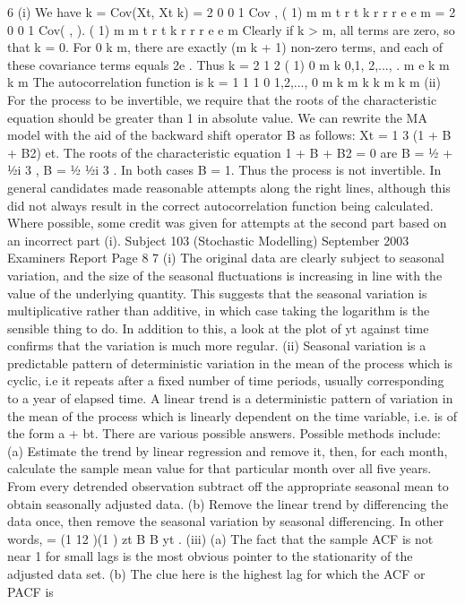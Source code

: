 6 (i) We have
k = Cov(Xt, Xt k) = 2
0 0
1
Cov ,
( 1)
m m
t r t k r
r r
e e
m
= 2
0 0
1
Cov( , ).
( 1)
m m
t r t k r
r r
e e
m
Clearly if k > m, all terms are zero, so that k = 0.
For 0 k m, there are exactly (m k + 1) non-zero terms, and each of these
covariance terms equals 2e . Thus
k =
2
1 2
( 1)
0
m k 0,1, 2,..., .
m e
k m
k m
The autocorrelation function is
k = 1
1
1 0
1,2,...,
0
m k
m
k
k m
k m
(ii) For the process to be invertible, we require that the roots of the characteristic
equation should be greater than 1 in absolute value.
We can rewrite the MA model with the aid of the backward shift operator B as
follows:
Xt =
1
3
(1 + B + B2) et.
The roots of the characteristic equation
1 + B + B2 = 0
are B = ½ + ½i 3 , B = ½ ½i 3 .
In both cases B = 1. Thus the process is not invertible.
In general candidates made reasonable attempts along the right lines, although this did not always
result in the correct autocorrelation function being calculated. Where possible, some credit was
given for attempts at the second part based on an incorrect part (i).
Subject 103 (Stochastic Modelling) September 2003 Examiners Report
Page 8
7 (i) The original data are clearly subject to seasonal variation, and the size of the
seasonal fluctuations is increasing in line with the value of the underlying
quantity. This suggests that the seasonal variation is multiplicative rather than
additive, in which case taking the logarithm is the sensible thing to do. In
addition to this, a look at the plot of yt against time confirms that the variation
is much more regular.
(ii) Seasonal variation is a predictable pattern of deterministic variation in the
mean of the process which is cyclic, i.e it repeats after a fixed number of time
periods, usually corresponding to a year of elapsed time.
A linear trend is a deterministic pattern of variation in the mean of the process
which is linearly dependent on the time variable, i.e. is of the form a + bt.
There are various possible answers. Possible methods include:
(a) Estimate the trend by linear regression and remove it, then, for each
month, calculate the sample mean value for that particular month over
all five years. From every detrended observation subtract off the
appropriate seasonal mean to obtain seasonally adjusted data.
(b) Remove the linear trend by differencing the data once, then remove the
seasonal variation by seasonal differencing. In other words,
= (1 12 )(1 ) zt B B yt .
(iii) (a) The fact that the sample ACF is not near 1 for small lags is the most
obvious pointer to the stationarity of the adjusted data set.
(b) The clue here is the highest lag for which the ACF or PACF is
